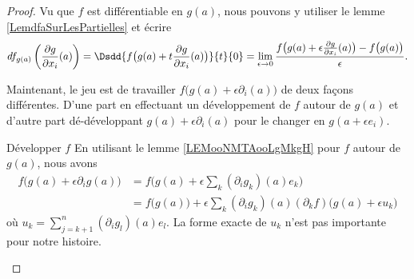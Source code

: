 \begin{proof}
    Vu que \( f\) est différentiable en \( g(a)\), nous pouvons y utiliser le lemme \ref{LemdfaSurLesPartielles} et écrire
    \begin{equation}        \label{EQooFZBVooTwNexc}
        df_{g(a)}\left( \frac{ \partial g }{ \partial x_i }(a) \right)=\Dsdd{ f\big( g(a)+t\frac{ \partial g }{ \partial x_i }(a) \big) }{t}{0}
        =\lim_{\epsilon\to 0}\frac{ f\big( g(a)+\epsilon\frac{ \partial g }{ \partial x_i }(a) \big)-f\big( g(a) \big) }{ \epsilon }.
    \end{equation}
    
    Maintenant, le jeu est de travailler \( f\big( g(a)+\epsilon\partial_i(a) \big)\) de deux façons différentes. D'une part en effectuant un développement de \( f\) autour de \( g(a)\) et d'autre part dé-développant \( g(a)+\epsilon\partial_i(a)\) pour le changer en \( g(a+\epsilon e_i)\).

    \begin{subproof}
        \item[Développer \( f\)]
            En utilisant le lemme \ref{LEMooNMTAooLgMkgH} pour \( f\) autour de \( g(a)\), nous avons
            \begin{subequations}
                \begin{align}
                    f\big( g(a)+\epsilon\partial_ig(a) \big)&=f\big( g(a)+\epsilon\sum_k(\partial_ig_k)(a)e_k \big)\\
                    &=f\big( g(a) \big)+\epsilon\sum_k(\partial_ig_k)(a)(\partial_kf)\big(g(a)+\epsilon u_k\big)
                \end{align}
            \end{subequations}
            où \( u_k=\sum_{j=k+1}^n(\partial_ig_l)(a)e_l\). La forme exacte de \( u_k\) n'est pas importante pour notre histoire.


\end{subproof}
\end{proof}
